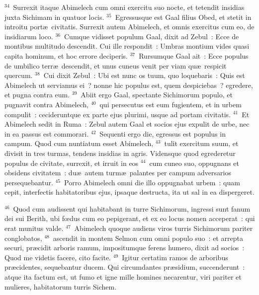 ${}^{34}$~Surrexit itaque Abimelech cum omni exercitu suo nocte, et tetendit insidias juxta Sichimam in quatuor locis.
${}^{35}$~Egressusque est Gaal filius Obed, et stetit in introitu port\ae\ civitatis. Surrexit autem Abimelech, et omnis exercitus cum eo, de insidiarum loco.
${}^{36}$~Cumque vidisset populum Gaal, dixit ad Zebul~: Ecce de montibus multitudo descendit. Cui ille respondit~: Umbras montium vides quasi capita hominum, et hoc errore deciperis.
${}^{37}$~Rursumque Gaal ait~: Ecce populus de umbilico terr\ae\ descendit, et unus cuneus venit per viam qu\ae\ respicit quercum.
${}^{38}$~Cui dixit Zebul~: Ubi est nunc os tuum, quo loquebaris~: Quis est Abimelech ut serviamus ei~? nonne hic populus est, quem despiciebas~? egredere, et pugna contra eum.
${}^{39}$~Abiit ergo Gaal, spectante Sichimorum populo, et pugnavit contra Abimelech,
${}^{40}$~qui persecutus est eum fugientem, et in urbem compulit~: cecideruntque ex parte ejus plurimi, usque ad portam civitatis.
${}^{41}$~Et Abimelech sedit in Ruma~: Zebul autem Gaal et socios ejus expulit de urbe, nec in ea passus est commorari.
${}^{42}$~Sequenti ergo die, egressus est populus in campum. Quod cum nuntiatum esset Abimelech,
${}^{43}$~tulit exercitum suum, et divisit in tres turmas, tendens insidias in agris. Vidensque quod egrederetur populus de civitate, surrexit, et irruit in eos
${}^{44}$~cum cuneo suo, oppugnans et obsidens civitatem~: du\ae\ autem turm\ae\ palantes per campum adversarios persequebantur.
${}^{45}$~Porro Abimelech omni die illo oppugnabat urbem~: quam cepit, interfectis habitatoribus ejus, ipsaque destructa, ita ut sal in ea dispergeret.


${}^{46}$~Quod cum audissent qui habitabant in turre Sichimorum, ingressi sunt fanum dei sui Berith, ubi fœdus cum eo pepigerant, et ex eo locus nomen acceperat~: qui erat munitus valde.
${}^{47}$~Abimelech quoque audiens viros turris Sichimorum pariter conglobatos,
${}^{48}$~ascendit in montem Selmon cum omni populo suo~: et arrepta securi, pr\ae cidit arboris ramum, impositumque ferens humero, dixit ad socios~: Quod me videtis facere, cito facite.
${}^{49}$~Igitur certatim ramos de arboribus pr\ae cidentes, sequebantur ducem. Qui circumdantes pr\ae sidium, succenderunt~: atque ita factum est, ut fumo et igne mille homines necarentur, viri pariter et mulieres, habitatorum turris Sichem.


